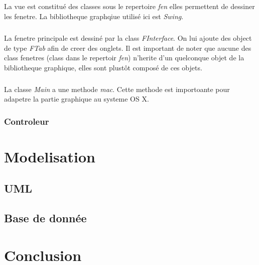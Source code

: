 \documentclass[a4paper,10pt]{report}
\begin{document}
	\paragraph*{}
	La vue est constitué des classes sous le repertoire \textit{fen} elles permettent de dessiner les fenetre. La bibliotheque graphqiue utilisé ici est \textit{Swing}.

	\paragraph*{}
	La fenetre principale est dessiné par la class \textit{FInterface}. On lui ajoute des object de type \textit{FTab} afin de creer des onglets. Il est important de noter que aucune des class fenetres (class dans le repertoir \textit{fen}) n'herite d'un quelconque objet de la bibliotheque graphique, elles sont plustôt composé de ces objets.

	\paragraph*{}
	La classe \textit{Main} a une methode \textit{mac}. Cette methode est importoante pour adapetre la partie graphique au systeme OS X.

\subsection{Controleur}

\chapter{Modelisation}

	\section{UML}

	\section{Base de donnée}

\chapter*{Conclusion}
\end{document}
